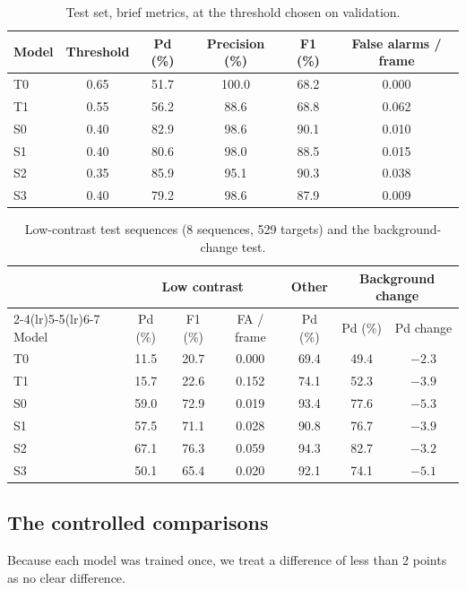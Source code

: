 \documentclass[11pt,a4paper]{article}
\begin{document}
\begin{table}[htbp]
\centering
\caption{Test set, brief metrics, at the threshold chosen on validation.}
\label{tab:brief-metrics}
\begin{tabular}{lccccc}
\toprule
Model & Threshold & Pd (\%) & Precision (\%) & F1 (\%) & False alarms / frame \\
\midrule
T0 & 0.65 & 51.7 & 100.0 & 68.2 & 0.000 \\
T1 & 0.55 & 56.2 & 88.6 & 68.8 & 0.062 \\
S0 & 0.40 & 82.9 & 98.6 & 90.1 & 0.010 \\
S1 & 0.40 & 80.6 & 98.0 & 88.5 & 0.015 \\
S2 & 0.35 & 85.9 & 95.1 & 90.3 & 0.038 \\
S3 & 0.40 & 79.2 & 98.6 & 87.9 & 0.009 \\
\bottomrule
\end{tabular}
\end{table}

\begin{table}[htbp]
\centering
\caption{Low-contrast test sequences (8 sequences, 529 targets) and the background-change test.}
\label{tab:lowc-bg}
\begin{tabular}{lcccccc}
\toprule
 & \multicolumn{3}{c}{Low contrast} & Other & \multicolumn{2}{c}{Background change} \\
\cmidrule(lr){2-4}\cmidrule(lr){5-5}\cmidrule(lr){6-7}
Model & Pd (\%) & F1 (\%) & FA / frame & Pd (\%) & Pd (\%) & Pd change \\
\midrule
T0 & 11.5 & 20.7 & 0.000 & 69.4 & 49.4 & $-2.3$ \\
T1 & 15.7 & 22.6 & 0.152 & 74.1 & 52.3 & $-3.9$ \\
S0 & 59.0 & 72.9 & 0.019 & 93.4 & 77.6 & $-5.3$ \\
S1 & 57.5 & 71.1 & 0.028 & 90.8 & 76.7 & $-3.9$ \\
S2 & 67.1 & 76.3 & 0.059 & 94.3 & 82.7 & $-3.2$ \\
S3 & 50.1 & 65.4 & 0.020 & 92.1 & 74.1 & $-5.1$ \\
\bottomrule
\end{tabular}
\end{table}

\subsection{The controlled comparisons}

Because each model was trained once, we treat a difference of less than 2 points as no clear difference.
\end{document}
